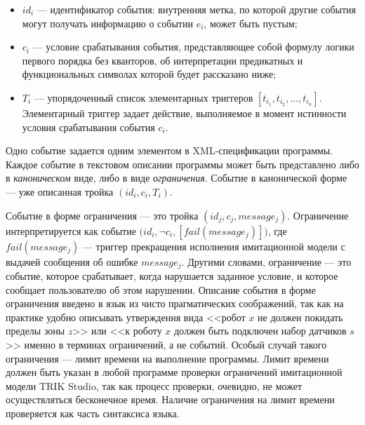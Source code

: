 \documentclass[conference]{IEEEtran}
\begin{document}
\begin{itemize}
    \item $id_i$ --- идентификатор события: внутренняя метка, по которой другие события могут получать информацию о событии $e_i$, может быть пустым;
    \item $c_i$ --- условие срабатывания события, представляющее собой формулу логики первого порядка без кванторов, об интерпретации предикатных и функциональных символах которой будет рассказано ниже;
    \item $T_i$ --- упорядоченный список элементарных триггеров $[ t_{i_1}, t_{i_2}, ..., t_{i_n} ]$. Элементарный триггер задает действие, выполняемое в момент истинности условия срабатывания события $c_i$.
\end{itemize}

Одно событие задается одним элементом в XML-спецификации программы. Каждое событие в текстовом описании 
программы может быть представлено либо в \textit{каноническом} виде, либо в виде \textit{ограничения}. Событие в канонической форме --- уже описанная тройка $(id_i, c_i, T_i)$.

Событие в форме ограничения --- это тройка $(id_j, c_j, message_j)$. Ограничение интерпретируется как событие $(id_i, $$\neg$$c_i, [ fail(message_j) ])$, где $fail(message_j)$ --- триггер прекращения исполнения имитационной модели с выдачей сообщения об ошибке $message_j$. Другими словами, ограничение --- это событие, которое срабатывает, когда нарушается заданное условие, и которое сообщает пользователю об этом нарушении. Описание события в форме ограничения введено в язык из чисто прагматических соображений, так как на практике удобно описывать утверждения вида <<робот $x$ не должен покидать пределы зоны $z$>> или <<к роботу $x$ должен быть подключен набор датчиков $s$>> именно в терминах ограничений, а не событий. Особый случай такого ограничения --- лимит времени на выполнение программы. Лимит времени должен быть указан в любой программе проверки ограничений имитационной модели TRIK Studio, так как процесс проверки, очевидно, не может осуществляться бесконечное время. Наличие ограничения на лимит времени проверяется как часть синтаксиса языка.
\end{document}
